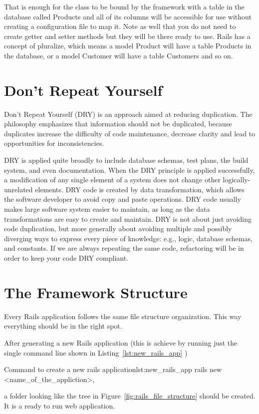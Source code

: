 That is enough for the class to be bound by the framework with a table in the database called Products and all of its columns will be accessible for use without creating a configuration file to map it. Note as well that you do not need to create getter and setter methods but they will be there ready to use.
Rails has a concept of pluralize, which means a model Product will have a table Products in the database, or a model Customer will have a table Customers and so on.



\section{Don’t Repeat Yourself} 
Don’t Repeat Yourself (DRY) is an approach aimed at reducing duplication. 
The philosophy emphasizes that information should not be duplicated, 
because duplicates increase the difficulty of code maintenance, 
decrease clarity and lead to opportunities for inconsistencies.

DRY is applied quite broadly to include database schemas, 
test plans, the build system, and even documentation. 
When the DRY principle is applied successfully, 
a modification of any single element of a system does not change other logically-unrelated elements.
DRY code is created by data transformation, which allows the software developer to avoid copy and paste operations.
DRY code usually makes large software system easier to maintain, 
as long as the data transformations are easy to create and maintain.
DRY is not about just avoiding code duplication, 
but more generally about avoiding multiple and possibly diverging ways to express every piece of knowledge: 
e.g., logic, database schemas, and constants.
If we are always repeating the same code, 
refactoring will be in order to keep your code DRY compliant. 



\section{The Framework Structure} 
Every Rails application follows the same file structure organization. 
This way everything should be in the right spot.

After generating a new Rails application 
(this is achieve by running just the single command line shown in Listing~\ref{lst:new_rails_app} ) 
\begin{rubycode}{Command to create a new rails application}{lst:new_rails_app}
  rails new <name_of_the_appliction>,

\end{rubycode}
a folder looking like the tree in Figure~\ref{fig:rails_file_structure} should be created. 
It is a ready to run web application.

